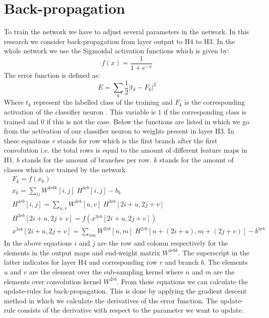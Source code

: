 \documentclass[a4paper,onecolumn]{report}
\begin{document}
\section{Back-propagation}
\label{sec:BP}
To train the network we have to adjust several parameters in the network. In this research we consider back-propagation from layer output to H4 to H3. In the whole network we use the Sigmoidal activation functions which is given by:
\begin{equation}
f(x)=\frac{1}{1+e^{-x}} 
\end{equation}	
The error function is defined as:
\begin{equation}
E=\sum_{k} \frac{1}{2}|t_k-F_{k}|^{2}
\end{equation}
Where $t_k$ represent the labelled class of the training and $F_{k}$ is the corresponding activation of the classifier neuron . This variable is $1$ if the corresponding class is trained and $0$ if this is not the case. Below the functions are listed in which we go from the activation of our classifier neuron to weights present in layer H3. In these equations $r$ stands for row which is the first branch after the first convolution i.e. the total rows is equal to the amount of different feature maps in H1. $b$ stands for the amount of branches per row. $k$ stands for the amount of classes which are trained by the network.
\begin{equation}
\begin{split}
	&F_{k}= f( x_{k}) \\
	& x_{k}=\sum_{ij} W^{4rbk}[i,j] \; H^{4rb}[i,j] - b_{k} \\
	&H^{4rb}[i,j]= \sum_{u,v} W^{3rb}[u,v] \; H^{3rb} [2i+u,2j+v] \\
	&H^{3rb} [2i+u,2j+v]= f\left (x^{3rb}[2i+u,2j+v] \right) \\
	&x^{3rb}[2i+u,2j+v]=\sum_{nm} W^{2rb}[n,m] \; H^{2rb}[n+(2i+u),m+(2j+v)] -b^{3rb}
\end{split}
\end{equation}
In the above equations $i$ and $j$ are the row and colomn respectively for the elements in the output maps and end-weight matrix $ W^{4rbk}$. The superscript in the latter indicates for layer H4 and corresponding row $r$ and branch $b$. The elements $u$ and $v$ are the element over the sub-sampling kernel where $n$ and $m$ are the elements over convolution kernel $W^{2rb}$. From these equations we can calculate the update-rules for back-propagation. This is done by applying the gradient descent method in which we calculate the derivatives of the error function. The update-rule consists of the derivative with respect to the parameter we want to update.  
\end{document}
